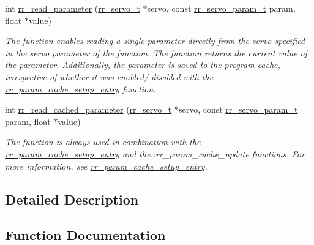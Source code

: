 \begin{DoxyCompactItemize}
int \hyperlink{group___realtime_gae665cf9423955f882e94282d66ba6a60}{rr\+\_\+read\+\_\+parameter} (\hyperlink{structrr__servo__t}{rr\+\_\+servo\+\_\+t} $\ast$servo, const \hyperlink{api_8h_aa1f58887fab4642cf49f6f453c1d276d}{rr\+\_\+servo\+\_\+param\+\_\+t} param, float $\ast$value)
\begin{DoxyCompactList}\small\item\em The function enables reading a single parameter directly from the servo specified in the \textquotesingle{}servo\textquotesingle{} parameter of the function. The function returns the current value of the parameter. Additionally, the parameter is saved to the program cache, irrespective of whether it was enabled/ disabled with the \hyperlink{group___realtime_ga770c1e8b4d868cea649592e26a2706dd}{rr\+\_\+param\+\_\+cache\+\_\+setup\+\_\+entry} function. \end{DoxyCompactList}\item 
int \hyperlink{group___realtime_ga9249202a29031f84b7dc3da37db05dfc}{rr\+\_\+read\+\_\+cached\+\_\+parameter} (\hyperlink{structrr__servo__t}{rr\+\_\+servo\+\_\+t} $\ast$servo, const \hyperlink{api_8h_aa1f58887fab4642cf49f6f453c1d276d}{rr\+\_\+servo\+\_\+param\+\_\+t} param, float $\ast$value)
\begin{DoxyCompactList}\small\item\em The function is always used in combination with the \hyperlink{group___realtime_ga770c1e8b4d868cea649592e26a2706dd}{rr\+\_\+param\+\_\+cache\+\_\+setup\+\_\+entry} and the\+::rr\+\_\+param\+\_\+cache\+\_\+update functions. For more information, see \hyperlink{group___realtime_ga770c1e8b4d868cea649592e26a2706dd}{rr\+\_\+param\+\_\+cache\+\_\+setup\+\_\+entry}. \end{DoxyCompactList}\end{DoxyCompactItemize}


\subsection{Detailed Description}


\subsection{Function Documentation}
\mbox{\label{group___realtime_ga770c1e8b4d868cea649592e26a2706dd}} 
